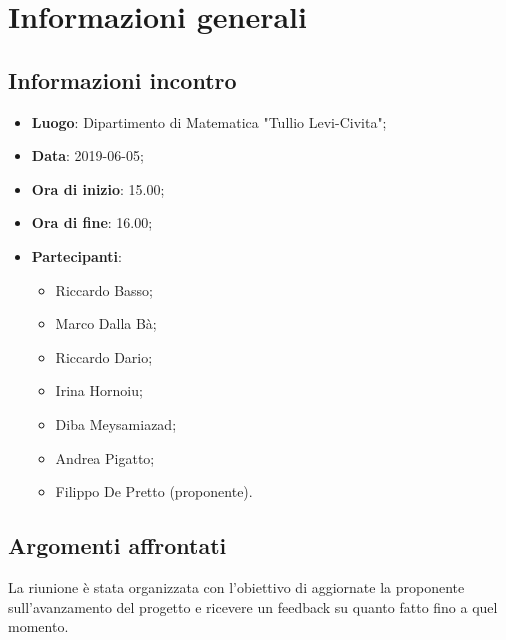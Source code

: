 \section{Informazioni generali}

\subsection{Informazioni incontro}
\begin{itemize}
	\item \textbf{Luogo}: Dipartimento di Matematica "Tullio Levi-Civita";
	\item \textbf{Data}: 2019-06-05;
	\item \textbf{Ora di inizio}: 15.00;
	\item \textbf{Ora di fine}: 16.00;
	\item \textbf{Partecipanti}: 
	\begin{itemize}
		\item Riccardo Basso;
		\item Marco Dalla Bà;
		\item Riccardo Dario;
		\item Irina Hornoiu;
		\item Diba Meysamiazad;
		\item Andrea Pigatto;
		\item Filippo De Pretto (proponente).	
	\end{itemize}
\end{itemize}

\subsection{Argomenti affrontati}
La riunione è stata organizzata con l'obiettivo di aggiornate la proponente sull'avanzamento del progetto e ricevere un feedback su quanto fatto fino a quel momento.